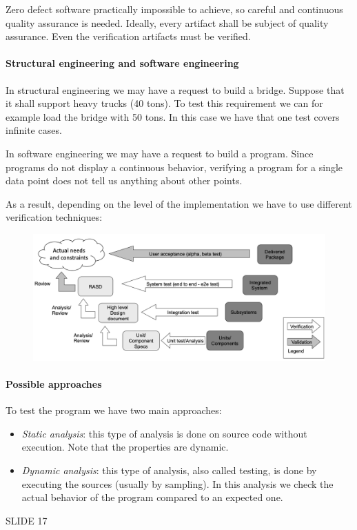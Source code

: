 Zero defect software practically impossible to achieve, so careful and continuous quality assurance is needed. 
Ideally, every artifact shall be subject of quality assurance.
Even the verification artifacts must be verified. 

\paragraph*{Structural engineering and software engineering}
In structural engineering we may have a request to build a bridge. 
Suppose that it shall support heavy trucks (40 tons). 
To test this requirement we can for example load the bridge with 50 tons. 
In this case we have that one test covers infinite cases. 

In software engineering we may have a request to build a program.
Since programs do not display a continuous behavior, verifying a program for a single data point does not tell us anything about other points. 

As a result, depending on the level of the implementation we have to use different verification techniques: 
\begin{figure}[H]
    \centering
    \includegraphics[width=0.75\linewidth]{images/ver1.png}
\end{figure}

\paragraph*{Possible approaches}
To test the program we have two main approaches: 
\begin{itemize}
    \item \textit{Static analysis}: this type of analysis is done on source code without execution. 
        Note that the properties are dynamic. 
    \item \textit{Dynamic analysis}: this type of analysis, also called testing, is done by executing the sources (usually by sampling). 
        In this analysis we check the actual behavior of the program compared to an expected one. 
\end{itemize}


SLIDE 17